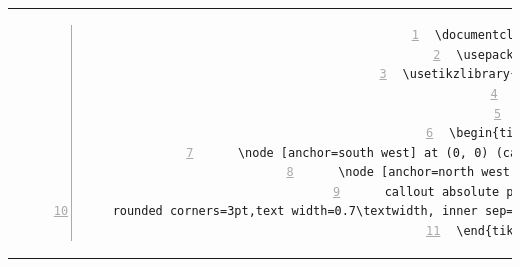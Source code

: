 \subsection{ }
 
\begin{tabular}{c | c}
\begin{minipage}[m]{0.4\textwidth}
\enum{
\begin{tikzpicture}
    \node [anchor=south west] at (0, 0) (cartoon) {\texttt{[image: example-image-a]}};
    \node [anchor=north west,rectangle callout,draw=black,
    callout absolute pointer=(cartoon.east), 
    rounded corners=3pt,text width=0.7\textwidth, inner sep=2ex] at (.19\textwidth,.125\textwidth) {This is an example.};
\end{tikzpicture}}{\thesubsection}
\end{minipage}
&
\begin{minipage}[m]{0.55\textwidth}
\renewcommand\textminus{\mbox{-}}%
\begin{lstlisting}[numberstyle=\zebra{red!15}{green!15},numbers=left,basicstyle=\scriptsize] 
\documentclass{article}
\usepackage{tikz}
\usetikzlibrary{shapes.callouts}
 

\begin{tikzpicture}
    \node [anchor=south west] at (0, 0) (cartoon) {\texttt{[image: example-image-a]}};
    \node [anchor=north west,rectangle callout,draw=black,
    callout absolute pointer=(cartoon.east), 
    rounded corners=3pt,text width=0.7\textwidth, inner sep=2ex] at (.19\textwidth,.125\textwidth) {This is an example.};
\end{tikzpicture}

\end{lstlisting}
\end{minipage}
\end{tabular}
 

\subsection{}
 
